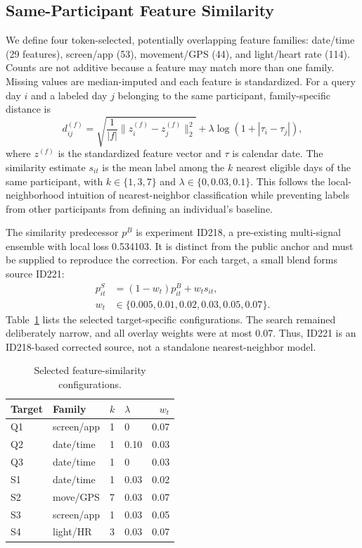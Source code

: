 \documentclass[conference]{IEEEtran}
\begin{document}
\subsection{Same-Participant Feature Similarity}
We define four token-selected, potentially overlapping feature families: date/time (29 features), screen/app (53), movement/GPS (44), and light/heart rate (114). Counts are not additive because a feature may match more than one family. Missing values are median-imputed and each feature is standardized. For a query day $i$ and a labeled day $j$ belonging to the same participant, family-specific distance is
\begin{equation}
d_{ij}^{(f)}=\sqrt{\frac{1}{|f|}\lVert z_i^{(f)}-z_j^{(f)}\rVert_2^2}
+\lambda\log(1+|\tau_i-\tau_j|),
\end{equation}
where $z^{(f)}$ is the standardized feature vector and $\tau$ is calendar date. The similarity estimate $s_{it}$ is the mean label among the $k$ nearest eligible days of the same participant, with $k\in\{1,3,7\}$ and $\lambda\in\{0,0.03,0.1\}$. This follows the local-neighborhood intuition of nearest-neighbor classification \cite{cover1967nearest} while preventing labels from other participants from defining an individual's baseline.

The similarity predecessor $p^{B}$ is experiment ID218, a pre-existing multi-signal ensemble with local loss 0.534103. It is distinct from the public anchor and must be supplied to reproduce the correction. For each target, a small blend forms source ID221:
\begin{equation}
\begin{aligned}
p^{S}_{it}&=(1-w_t)p^{B}_{it}+w_t s_{it},\\
w_t&\in\{0.005,0.01,0.02,0.03,0.05,0.07\}.
\end{aligned}
\end{equation}
Table~\ref{tab:configs} lists the selected target-specific configurations. The search remained deliberately narrow, and all overlay weights were at most 0.07. Thus, ID221 is an ID218-based corrected source, not a standalone nearest-neighbor model.

\begin{table}[t]
\centering
\caption{Selected feature-similarity configurations.}
\label{tab:configs}
\begin{tabular}{@{}llllr@{}}
\toprule
Target & Family & $k$ & $\lambda$ & $w_t$ \\
\midrule
Q1 & screen/app & 1 & 0 & 0.07 \\
Q2 & date/time & 1 & 0.10 & 0.03 \\
Q3 & date/time & 1 & 0 & 0.03 \\
S1 & date/time & 1 & 0.03 & 0.02 \\
S2 & move/GPS & 7 & 0.03 & 0.07 \\
S3 & screen/app & 1 & 0.03 & 0.05 \\
S4 & light/HR & 3 & 0.03 & 0.07 \\
\bottomrule
\end{tabular}
\end{table}
\end{document}
